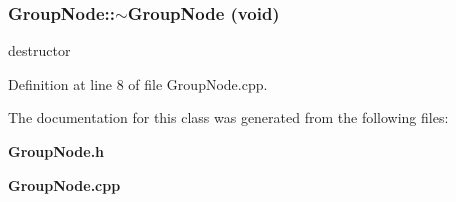 \subsubsection{\setlength{\rightskip}{0pt plus 5cm}GroupNode::$\sim$GroupNode (void)\hspace{0.3cm}{\tt  [virtual]}}\label{classGroupNode_76112483fe680b62637195541a017e75}


destructor 



Definition at line 8 of file GroupNode.cpp.

The documentation for this class was generated from the following files:\begin{CompactItemize}
\item 
{\bf GroupNode.h}\item 
{\bf GroupNode.cpp}\end{CompactItemize}
